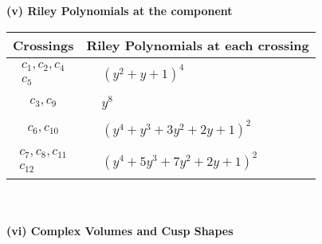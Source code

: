\documentclass[1p]{elsarticle_modified}
\theoremstyle{definition}
\begin{document}
\newpage\renewcommand{\arraystretch}{1}
\flushleft \textbf{(v) Riley Polynomials at the component}\newline \\
\begin{tabular}{m{50pt}|m{274pt}}
Crossings & \hspace{64pt}Riley Polynomials at each crossing \\
\hline $$\begin{aligned}c_{1},c_{2},c_{4}\\c_{5}\end{aligned}$$&$\begin{aligned}
&(y^2+y+1)^4
\end{aligned}$\\
\hline $$\begin{aligned}c_{3},c_{9}\end{aligned}$$&$\begin{aligned}
&y^8
\end{aligned}$\\
\hline $$\begin{aligned}c_{6},c_{10}\end{aligned}$$&$\begin{aligned}
&(y^4+y^3+3 y^2+2 y+1)^2
\end{aligned}$\\
\hline $$\begin{aligned}c_{7},c_{8},c_{11}\\c_{12}\end{aligned}$$&$\begin{aligned}
&(y^4+5 y^3+7 y^2+2 y+1)^2
\end{aligned}$\\
\hline
\end{tabular}\\~\\
\newpage\flushleft \textbf{(vi) Complex Volumes and Cusp Shapes}
\end{document}
